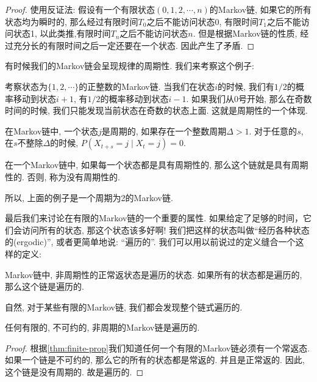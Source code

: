 \begin{proof}
    使用反证法: 假设有一个有限状态$(0,1,2,\cdots, n)$的Markov链, 如果它的所有状态均为瞬时的, 那么经过有限时间$T_0$之后不能访问状态0, 有限时间$T_1$之后不能访问状态1, 以此类推,有限时间$T_n$之后不能访问状态$n$. 但是根据Markov链的性质, 经过充分长的有限时间之后一定还要在一个状态. 因此产生了矛盾. 
\end{proof}

有时候我们的Markov链会呈现规律的周期性. 我们来考察这个例子: 

\begin{example}
    考察状态为$\{1,2,\cdots\}$的正整数的Markov链. 当我们在状态$i$的时候, 我们有$1/2$的概率移动到状态$i+1$, 有$1/2$的概率移动到状态$i-1$. 如果我们从0号开始, 那么在奇数时间的时候, 我们只能发现当前状态在奇数的状态上面. 这就是周期性的一个体现. 
\end{example}

\begin{definition}
    在Markov链中, 一个状态$j$是周期的, 如果存在一个整数周期$\Delta>1$. 对于任意的$s$, 在$s$不整除$\Delta$的时候, $P\left(X_{t+s}=j \mid X_t=j\right)=0$. 

    在一个Markov链中, 如果每一个状态都是具有周期性的, 那么这个链就是具有周期性的. 否则, 称为没有周期性的. 
\end{definition}

所以, 上面的例子是一个周期为2的Markov链. 

最后我们来讨论在有限的Markov链的一个重要的属性. 如果给定了足够的时间，它们会访问所有的状态, 那这个状态该多好啊! 我们把这样的状态叫做``经历各种状态的(ergodic)'', 或者更简单地说: ``遍历的''. 我们可以用以前说过的定义缝合一个这样的定义: 

\begin{definition}
    Markov链中, 非周期性的正常返状态是遍历的状态. 如果所有的状态都是遍历的, 那么这个链是遍历的. 
\end{definition}

自然, 对于某些有限的Markov链, 我们都会发现整个链式遍历的. 

\begin{theorem}
    任何有限的, 不可约的, 非周期的Markov链是遍历的. 
\end{theorem}

\begin{proof}
    根据\cref{thm:finite-prop}我们知道任何一个有限的Markov链必须有一个常返态. 如果一个链是不可约的, 那么它的所有的状态都是常返的. 并且是正常返的. 因此, 这个链是没有周期的. 故是遍历的. 
\end{proof}


